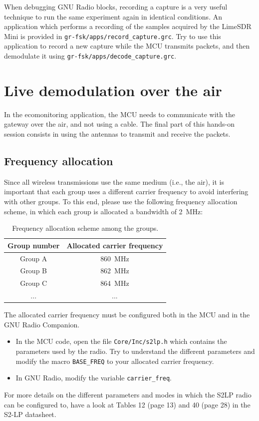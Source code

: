 When debugging GNU Radio blocks, recording a capture is a very useful technique to run the same experiment again in identical conditions.
An application which performs a recording of the samples acquired by the LimeSDR Mini is provided in \texttt{gr-fsk/apps/record\_capture.grc}.
Try to use this application to record a new capture while the MCU transmits packets, and then demodulate it using \texttt{gr-fsk/apps/decode\_capture.grc}.

\section{Live demodulation over the air}

In the ecomonitoring application, the MCU needs to communicate with the gateway over the air, and not using a cable.
The final part of this hands-on session consists in using the antennas to transmit and receive the packets.

\subsection{Frequency allocation}

Since all wireless transmissions use the same medium (i.e., the air), it is important that each group uses a different carrier frequency to avoid interfering with other groups.
To this end, please use the following frequency allocation scheme, in which each group is allocated a bandwidth of \SI{2}{\mega\hertz}:
\begin{table}[h]
    \centering
    \begin{tabular}{c|c}
        Group number & Allocated carrier frequency\\
        \hline
        Group A & \SI{860}{\mega\hertz}\\
         Group B & \SI{862}{\mega\hertz}\\
         Group C & \SI{864}{\mega\hertz}\\
         ... & ...
    \end{tabular}
    \caption{Frequency allocation scheme among the groups.}
    \label{tab:freq_alloc}
\end{table}

The allocated carrier frequency must be configured both in the MCU and in the GNU Radio Companion.
\begin{itemize}
    \item In the MCU code, open the file \texttt{Core/Inc/s2lp.h} which contains the parameters used by the radio.
    Try to understand the different parameters and modify the macro \texttt{BASE\_FREQ} to your allocated carrier frequency.
    \item In GNU Radio, modify the variable \texttt{carrier\_freq}.
\end{itemize}
For more details on the different parameters and modes in which the S2LP radio can be configured to, have a look at Tables 12 (page 13) and 40 (page 28) in the S2-LP datasheet.

